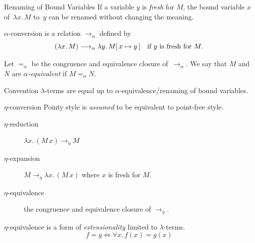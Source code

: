 \begin{frame}{Renaming of Bound Variables}
If a variable $y$ is \emph{fresh} for $M$, the bound variable $x$ of~$\lambda
x.\, M$ to~$y$ can be renamed without changing the meaning. 
\begin{definition}
  $\alpha$-conversion is a relation $\to_\alpha$ defined by
  \[
    (\lambda x.\, M) \longrightarrow_\alpha \lambda y.\, M[\,x\mapsto y\,]
    \quad\text{if $y$ is fresh for $M$}.
  \]
\end{definition}
Let $=_\alpha$ be the congruence and equivalence closure
of~$\longrightarrow_\alpha$. We say that $M$ and $N$ are
\emph{$\alpha$-equivalent} if $M =_\alpha N$.

\begin{block}{Convention}
  $\lambda$-terms are equal up to $\alpha$-equivalence/renaming of bound variables. 
\end{block}
\end{frame}

\begin{frame}{$\eta$-conversion}
  Pointy style is \emph{assumed} to be equivalent to point-free style. 
  \begin{description}
    \item[$\eta$-reduction]
      $\lambda x.\,(M\,x) \longrightarrow_\eta M$
    \item[$\eta$-expansion]
      $M \longrightarrow_\eta \lambda x.\,(M\,x) $
      where $x$ is fresh for $M$.
    \item[$\eta$-equivalence]
      the congruence and equivalence closure of $\longrightarrow_\eta$. 
  \end{description}
  $\eta$-equivalence is a form of \emph{extensionality} limited to
  $\lambda$-terms.
  \[
    f = g \iff \forall x.\, f(x) = g(x)
  \]
\end{frame}

